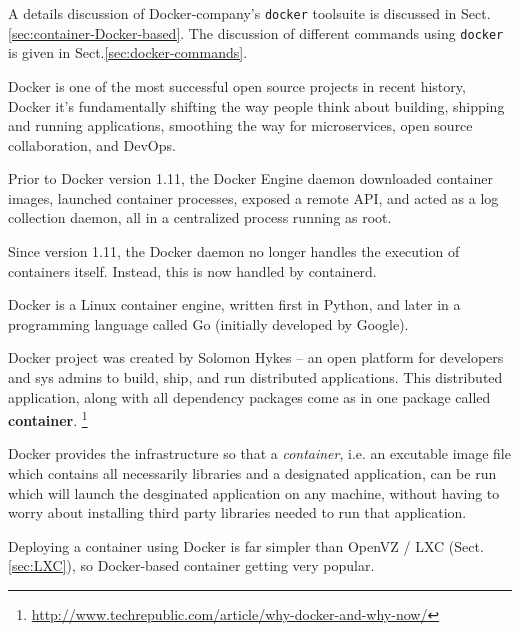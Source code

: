 A details discussion of Docker-company's \verb!docker! toolsuite is discussed in
Sect.\ref{sec:container-Docker-based}. The discussion of different commands using 
\verb!docker! is given in Sect.\ref{sec:docker-commands}.


Docker is one of the most successful open source projects in recent history,
Docker it’s fundamentally shifting the way people think about building, shipping
and running applications, smoothing the way for microservices, open source
collaboration, and DevOps.


Prior to Docker version 1.11, the Docker Engine daemon downloaded container
images, launched container processes, exposed a remote API, and acted as a log
collection daemon, all in a centralized process running as root.

Since version 1.11, the Docker daemon no longer handles the execution of
containers itself. Instead, this is now handled by containerd.

Docker is a Linux container engine, written first in Python, and later in a
programming language called Go (initially developed by Google).

Docker project was created by Solomon Hykes -- an open platform for developers
and sys admins to build, ship, and run distributed applications. This
distributed application, along with all dependency packages come as in one
package called  {\bf container}.
\footnote{\url{http://www.techrepublic.com/article/why-docker-and-why-now/}}

Docker provides the infrastructure so that a {\it container}, i.e. an excutable
image file which contains all necessarily libraries and a designated
application, can be run which will launch the desginated application on any
machine, without having to worry about installing third party libraries needed
to run that application.


Deploying a container using Docker is far simpler than OpenVZ / LXC
(Sect.\ref{sec:LXC}), so Docker-based container getting very popular. 


